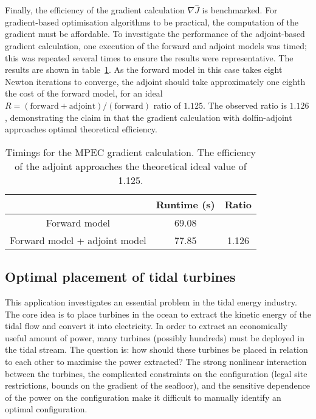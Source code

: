 \documentclass[prodmode,acmtoms]{acmsmall}
\begin{document}
Finally, the efficiency of the gradient calculation $\nabla \hat{J}$ is benchmarked. For gradient-based optimisation
algorithms to be practical, the computation of the gradient must be affordable. To investigate the performance of the
adjoint-based gradient calculation, one execution of the forward and adjoint models was timed; this was repeated
several times to ensure the results were representative. The results are shown in table~\ref{tab:mpec-timings}. As the forward
model in this case takes eight Newton iterations to converge, the adjoint should take approximately one eighth the cost
of the forward model, for an ideal $R=(\mathrm{forward} + \mathrm{adjoint})/(\mathrm{forward})$ ratio of $1.125$. The observed
ratio is $1.126$, demonstrating the claim in  that the gradient calculation with dolfin-adjoint 
approaches optimal theoretical efficiency.
\begin{table}
\centering
\begin{tabular}{ccc}
\toprule
       & Runtime (s) & Ratio \\
\midrule
Forward model &  69.08  &     \\
Forward model + adjoint model & 77.85 & 1.126 \\
\bottomrule
\end{tabular}
\caption{Timings for the MPEC gradient calculation. The efficiency of the adjoint approaches
the theoretical ideal value of 1.125.}
\label{tab:mpec-timings}
\end{table}
\subsection{Optimal placement of tidal turbines}\label{sec:turbine_optimisation}

This application investigates an essential problem in the tidal energy industry.
The core idea is to place turbines in the ocean to extract the kinetic energy of the tidal flow and convert it into electricity.
In order to extract an economically useful amount of power, many turbines (possibly hundreds) must be deployed in the tidal stream.
The question is: how should these turbines be placed in relation to each other to maximise the power extracted?
The strong nonlinear interaction between the turbines, the complicated constraints on the configuration (legal site
restrictions, bounds on the gradient of the seafloor), and the sensitive dependence of the power on the configuration make it difficult to
manually identify an optimal configuration.
\end{document}
